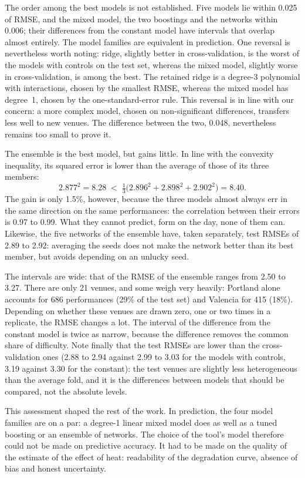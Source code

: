 \documentclass[11pt,a4paper]{article}
\begin{document}
The order among the best models is not established. Five models lie within 0.025 of RMSE, and the mixed model, the two
boostings and the networks within 0.006; their differences from the constant model have intervals that overlap almost
entirely. The model families are equivalent in prediction. One reversal is nevertheless worth noting: ridge, slightly
better in cross-validation, is the worst of the models with controls on the test set, whereas the mixed model,
slightly worse in cross-validation, is among the best. The retained ridge is a degree-3 polynomial with interactions,
chosen by the smallest RMSE, whereas the mixed model has degree~1, chosen by the one-standard-error rule. This reversal
is in line with our concern: a more complex model, chosen on non-significant differences, transfers less well to new
venues. The difference between the two, 0.048, nevertheless remains too small to prove it.

The ensemble is the best model, but gains little. In line with the convexity inequality, its squared error is lower
than the average of those of its three members:
\[
2.877^2 = 8.28 \;<\; \tfrac13\big(2.896^2 + 2.898^2 + 2.902^2\big) = 8.40 .
\]
The gain is only 1.5\%, however, because the three models almost always err in the same direction on the same
performances: the correlation between their errors is 0.97 to 0.99. What they cannot predict, form on the day, none of
them can. Likewise, the five networks of the ensemble have, taken separately, test RMSEs of 2.89 to 2.92: averaging the
seeds does not make the network better than its best member, but avoids depending on an unlucky seed.

The intervals are wide: that of the RMSE of the ensemble ranges from 2.50 to 3.27. There are only 21 venues, and some
weigh very heavily: Portland alone accounts for 686 performances (29\% of the test set) and Valencia for 415 (18\%).
Depending on whether these venues are drawn zero, one or two times in a replicate, the RMSE changes a lot. The interval
of the difference from the constant model is twice as narrow, because the difference removes the common share of
difficulty. Note finally that the test RMSEs are lower than the cross-validation ones (2.88 to 2.94 against 2.99 to 3.03
for the models with controls, 3.19 against 3.30 for the constant): the test venues are slightly less heterogeneous than
the average fold, and it is the differences between models that should be compared, not the absolute levels.

This assessment shaped the rest of the work. In prediction, the four model families are on a par: a degree-1 linear
mixed model does as well as a tuned boosting or an ensemble of networks. The choice of the tool's model therefore could
not be made on predictive accuracy. It had to be made on the quality of the estimate of the effect of heat:
readability of the degradation curve, absence of bias and honest uncertainty.
\end{document}

